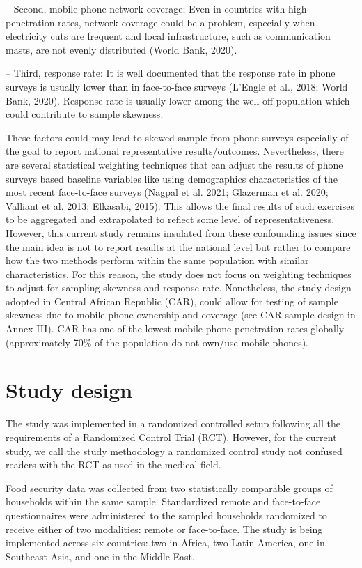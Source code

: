 \documentclass[11pt,harvard]{article}
\begin{document}
–	Second, mobile phone network coverage; Even in countries with high penetration rates, network coverage could be a problem, especially when electricity cuts are frequent and local infrastructure, such as communication masts, are not evenly distributed (World Bank, 2020).

–	Third, response rate: It is well documented that the response rate in phone surveys is usually lower than in face-to-face surveys (L’Engle et al., 2018; World Bank, 2020). Response rate is usually lower among the well-off population which could contribute to sample skewness.
 
These factors could may lead to skewed sample from phone surveys especially of the goal to report national representative results/outcomes. Nevertheless, there are several statistical weighting techniques that can adjust the results of phone surveys based baseline variables like using demographics characteristics of the most recent face-to-face surveys (Nagpal et al. 2021; Glazerman et al. 2020; Valliant et al. 2013; Elkasabi, 2015). This allows the final results of such exercises to be aggregated and extrapolated to reflect some level of representativeness. However, this current study remains insulated from these confounding issues since the main idea is not to report results at the national level but rather to compare how the two methods perform within the same population with similar characteristics. For this reason, the study does not focus on weighting techniques to adjust for sampling skewness and response rate. Nonetheless, the study design adopted in Central African Republic (CAR), could allow for testing of sample skewness due to mobile phone ownership and coverage (see CAR sample design in Annex III). CAR has one of the lowest mobile phone penetration rates globally (approximately 70\% of the population do not own/use mobile phones).

\pagebreak


\section{Study design}

The study was implemented in a randomized controlled setup following all the requirements of a Randomized Control Trial (RCT). However, for the current study, we call the study methodology a randomized control study not confused readers with the RCT as used in the medical field. 

Food security data was collected from two statistically comparable groups of households within the same sample. Standardized remote and face-to-face questionnaires were administered to the sampled households randomized to receive either of two modalities: remote or face-to-face. The study is being implemented across six countries: two in Africa, two Latin America, one in Southeast Asia, and one in the Middle East.
\end{document}
